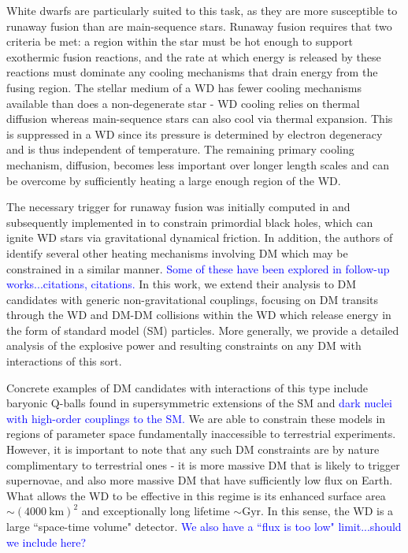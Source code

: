 \documentclass[twocolumn,showpacs,preprintnumbers,amsmath,amssymb,prd]{revtex4}
\begin{document}
White dwarfs are particularly suited to this task, as they are more susceptible to runaway fusion than are main-sequence stars. Runaway fusion requires that two criteria be met: a region within the star must be hot enough to support exothermic fusion reactions, and the rate at which energy is released by these reactions must dominate any cooling mechanisms that drain energy from the fusing region.  The stellar medium of a WD has fewer cooling mechanisms available than does a non-degenerate star - WD cooling relies on thermal diffusion whereas main-sequence stars can also cool via thermal expansion.  This is suppressed in a WD since its pressure is determined by electron degeneracy and is thus independent of temperature. The remaining primary cooling mechanism, diffusion, becomes less important over longer length scales and can be overcome by sufficiently heating a large enough region of the WD.

The necessary trigger for runaway fusion was initially computed in \cite{Woosley} and subsequently implemented in \cite{Graham:2015apa} to constrain primordial black holes, which can ignite WD stars via gravitational dynamical friction.  In addition, the authors of \cite{Graham:2015apa} identify several other heating mechanisms involving DM which may be constrained in a similar manner.  \textcolor{blue}{Some of these have been explored in follow-up works...citations, citations.}  In this work, we extend their analysis to DM candidates with generic non-gravitational couplings, focusing on DM transits through the WD and DM-DM collisions within the WD which release energy in the form of standard model (SM) particles. More generally, we provide a detailed analysis of the explosive power and resulting constraints on any DM with interactions of this sort.

Concrete examples of DM candidates with interactions of this type include baryonic Q-balls found in supersymmetric extensions of the SM and \textcolor{blue}{dark nuclei with high-order couplings to the SM.} We are able to constrain these models in regions of parameter space fundamentally inaccessible to terrestrial experiments. However, it is important to note that any such DM constraints are by nature complimentary to terrestrial ones - it is more massive DM that is likely to trigger supernovae, and also more massive DM that have sufficiently low flux on Earth. What allows the WD to be effective in this regime is its enhanced surface area $\sim (4000 ~\text{km})^2$ and exceptionally long lifetime $\sim \text{Gyr}$. In this sense, the WD is a large ``space-time volume" detector. \textcolor{blue}{We also have a ``flux is too low" limit...should we include here?}
\end{document}
